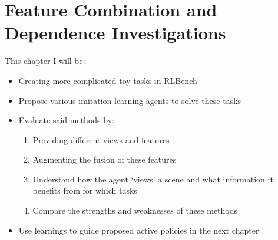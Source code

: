 \chapter{Feature Combination and Dependence Investigations}
This chapter I will be:
\begin{itemize}
  \item Creating more complicated toy tasks in RLBench
  \item Propose various imitation learning agents to solve these tasks
  \item Evaluate said methods by:
  \begin{enumerate}
    \item Providing different views and features
    \item Augmenting the fusion of these features
    \item Understand how the agent `views' a scene and what information it benefits from for which tasks
    \item Compare the strengths and weaknesses of these methods
  \end{enumerate}
  \item Use learnings to guide proposed active policies in the next chapter 
  
\end{itemize}










